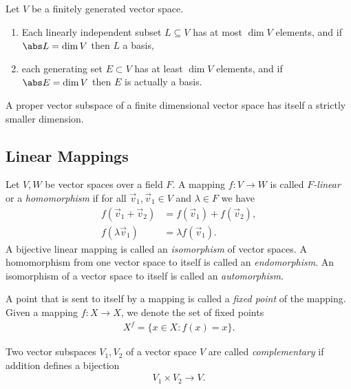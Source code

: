 \documentclass{article}
\begin{document}
\begin{corollary}[Notes 1.6.7]
	Let $V$ be a finitely generated vector space.
	\begin{enumerate}
		\item Each linearly independent subset $L\subseteq V$ has at most
		      $\dim V$ elements, and if $\abs L=\dim V$ then $L$ a basis,
		\item each generating set $E\subset V$ has at least $\dim V$ elements,
		      and if $\abs E=\dim V$ then $E$ is actually a basis.
	\end{enumerate}
\end{corollary}

\begin{corollary}[Notes 1.6.8]
	A proper vector subspace of a finite dimensional vector space has itself a
	strictly smaller dimension.
\end{corollary}

\subsection{Linear Mappings}

\begin{definition}
	Let $V,W$ be vector spaces over a field $F$. A mapping $f:V\to W$ is called
	\emph{$F$-linear} or a \emph{homomorphism} if for all $\vec v_1,\vec v_1\in V$ and $\lambda \in F$ we
	have
	\begin{align*}
		f(\vec v_1+\vec v_2) & = f(\vec v_1) + f(\vec v_2), \\
		f(\lambda \vec v_1)  & = \lambda f(\vec v_1).
	\end{align*}
	A bijective linear mapping is called an \emph{isomorphism} of vector spaces.
	A homomorphism from one vector space to itself is called an \emph{endomorphism}.
	An isomorphism of a vector space to itself is called an \emph{automorphism}.
\end{definition}

\begin{definition}
	A point that is sent to itself by a mapping is called a \emph{fixed point} of
	the mapping. Given a mapping $f:X\to X$, we denote the set of fixed points
	\begin{align*}
		X^f = \{x\in X : f(x)=x\}.
	\end{align*}
\end{definition}

\begin{definition}
	Two vector subspaces $V_1,V_2$ of a vector space $V$ are called \emph{complementary}
	if addition defines a bijection
	\begin{align*}
		V_1\times V_2 \to V.
	\end{align*}
\end{definition}
\end{document}
